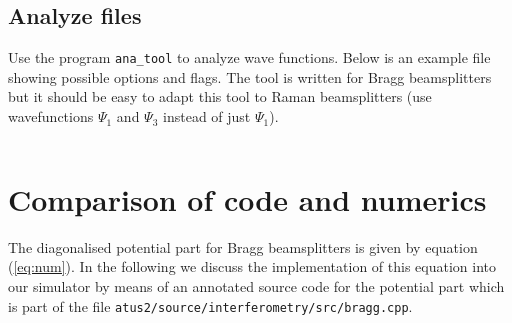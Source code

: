 \documentclass[12pt]{article}
\begin{document}
\subsection{Analyze files}
\label{sub:analyze_files}
Use the program \texttt{ana_tool} to analyze wave functions.
Below is an example file showing possible options and flags.
The tool is written for Bragg beamsplitters but it should be easy to adapt
this tool to Raman beamsplitters (use wavefunctions $\Psi_1$ and $\Psi_3$ instead of 
just $\Psi_1$).
\inputminted{xml}{tools.xml} \noindent 

\section{Comparison of code and numerics}
\label{sec:comparison_code_and_numerics}

The diagonalised potential part for Bragg beamsplitters is given by equation (\ref{eq:num}). 
In the following we discuss the implementation of this equation into our 
simulator by means of an annotated source code for the potential part which is part
of the file \texttt{atus2/source/interferometry/src/bragg.cpp}.
\end{document}
